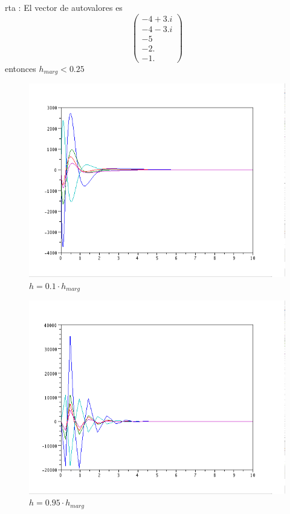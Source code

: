 \documentclass{article}
\begin{document}
\begin{itemize}
rta :
El vector de autovalores es 
\begin{equation*}
\begin{pmatrix}
  - 4 + 3.i  \\
  - 4 - 3.i  \\
  - 5        \\
  - 2.               \\
  - 1.   
	\end{pmatrix}
\end{equation*}
entonces $h_{marg} < 0.25$

\begin{figure}[H]
\includegraphics[width=\textwidth]{img/ej2-1-i.png}
\caption{$h=0.1 \cdot h_{marg}$}
\end{figure}

\begin{figure}[H]
\includegraphics[width=\textwidth]{img/ej2-1-ii.png}
\caption{$h=0.95 \cdot h_{marg}$}
\end{figure}


\end{itemize}
\end{document}
